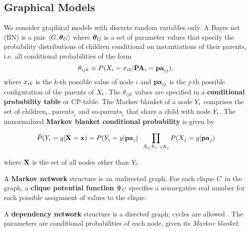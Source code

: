 \documentclass[twoside,leqno,twocolumn]{article}
\begin{document}
\subsection{Graphical Models} We consider graphical models with discrete random variables only. 
A Bayes net (BN) is a pair
$\langle{G,\boldsymbol{\theta}_G}\rangle$ where $\boldsymbol{\theta}_G$ is a set of parameter values that specify the  probability distributions of children conditional on instantiations of their parents, i.e. all conditional probabilities of the form
\[\theta_{ijk} \equiv P(X_{i}=x_{ik}|\mathbf{PA}_{i}=\mathbf{pa}_{ij}),\] where $x_{ik}$ is the $k$-th possible value of node $i$ and $\mathbf{pa}_{ij}$ is the $j$-th possible configuration of the parents of $X_{i}$. The $\theta_{ijk}$ values are specified in a \textbf{conditional probability table} %
or CP-table. The Markov blanket of a node $Y_{i}$ comprises the set of $\mbox{children}_{i}$, $\mbox{parents}_{i}$ and $\mbox{co-parents}_{i}$ that share a child with node $Y_{i}$. The unnormalized \textbf{Markov blanket conditional probability} %
is given by 

\begin{equation} \label{eq:bn-mb}
\tilde{P}(Y_{i} = y|\mathbf{X} = \mathbf{x}) = \\ P(Y_{i} = y|\mathbf{pa}_{i}) \cdot \prod_{X_{j}: Y_{i} \rightarrow X_{j}} P(X_{j} = y|\mathbf{pa}_{j})
\end{equation}

where $\mathbf{X}$ is the set of all nodes other than $Y_{i}$.

A \textbf{Markov network} structure is an undirected graph. For each clique $C$ in the graph, a \textbf{clique potential function} $\Psi_{C}$ specifies a nonnegative real number for each possible assignment of values to the clique. 

A \textbf{dependency network} structure is a directed graph; cycles are allowed \cite{Heckerman2000,bib:jensen-chapter,Natarajan2012}. The parameters are conditional probabilities of each node, given its {\em Markov blanket}.
\end{document}

